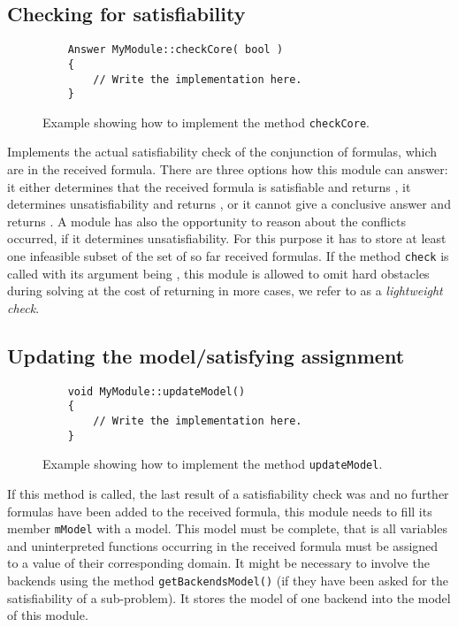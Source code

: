 \subsection{Checking for satisfiability}
\begin{figure}[htb]
\label{fig:exa_check}
\caption{Example showing how to implement the method \texttt{checkCore}.}
\begin{verbatim}
	Answer MyModule::checkCore( bool )
	{
	    // Write the implementation here.
	}
\end{verbatim}
\end{figure}
Implements the actual satisfiability check of the conjunction of formulas, which are in the received formula.
There are three options how this module can answer: it either determines that the received formula
is satisfiable and returns \True, it determines unsatisfiability and returns
\False, or it cannot give a conclusive answer and returns \Unknown. 
A module has also the opportunity to reason about the conflicts
occurred, if it determines unsatisfiability. For this purpose it has to store at least one infeasible
subset of the set of so far received formulas. If the method \texttt{check} is called with its argument being \false, this module is allowed to omit hard obstacles during solving at the cost of returning \UNKNOWN in more cases, we refer to as a \emph{lightweight check}.

\subsection{Updating the model/satisfying assignment}
\begin{figure}[htb]
\label{fig:exa_updateModel}
\caption{Example showing how to implement the method \texttt{updateModel}.}
\begin{verbatim}
	void MyModule::updateModel()
	{
	    // Write the implementation here.
	}
\end{verbatim}
\end{figure}
If this method is called, the last result of a satisfiability check was \True and no further formulas have been added to the received formula, this module needs to fill its member \texttt{mModel} with a model. This model must be complete, that is all variables and uninterpreted functions occurring in the received formula must be assigned to a value of their corresponding domain. It might be necessary to involve the backends using the method \texttt{getBackendsModel()} (if they have been asked for the satisfiability of a sub-problem). It stores the model of one backend into the model of this module.

